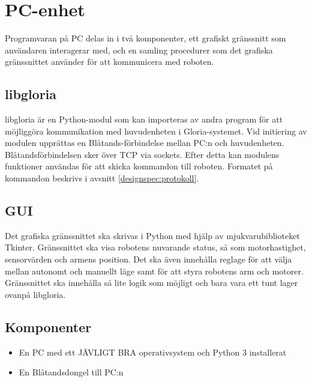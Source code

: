 \section{PC-enhet}
Programvaran på PC delas in i två komponenter, ett grafiskt gränssnitt som användaren interagerar med, och en samling procedurer som det grafiska gränssnittet använder för att kommunicera med roboten. 

\subsection{libgloria}
libgloria är en Python-modul som kan importeras av andra program för att möjliggöra kommunikation med huvudenheten i Gloria-systemet. Vid initiering av modulen upprättas en Blåtands-förbindelse mellan PC:n och huvudenheten. Blåtandsförbindelsen sker över TCP via sockets. Efter detta kan modulens funktioner användas för att skicka kommandon till roboten. Formatet på kommandon beskrivs i avsnitt \ref{designspec:protokoll}.

\subsection{GUI}
Det grafiska gränssnittet ska skrivas i Python med hjälp av mjukvarubiblioteket Tkinter. Gränssnittet ska visa robotens nuvarande status, så som motorhastighet, sensorvärden och armens position. Det ska även innehålla reglage för att välja mellan autonomt och manuellt läge samt för att styra robotens arm och motorer. Gränssnittet ska innehålla så lite logik som möjligt och bara vara ett tunt lager ovanpå libgloria.

\begin{figure}[h]
  \centerline{}
  \caption{}
\end{figure}

\subsection{Komponenter}
\begin{itemize}
\item En PC med ett JÄVLIGT BRA operativsystem och Python 3 installerat
\item En Blåtandsdongel till PC:n
\end{itemize}
